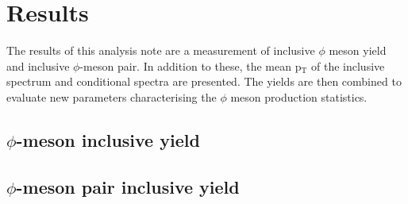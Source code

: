 \section{Results}
\label{sec:Results}
The results of this analysis note are a measurement of inclusive $\phi$ meson yield and inclusive $\phi$-meson pair. In addition to these, the mean p$_{\text{T}}$ of the inclusive spectrum and conditional spectra are presented. The yields are then combined to evaluate new parameters characterising the $\phi$ meson production statistics.
\subsection{$\phi$-meson inclusive yield}
\subsection{$\phi$-meson pair inclusive yield}

